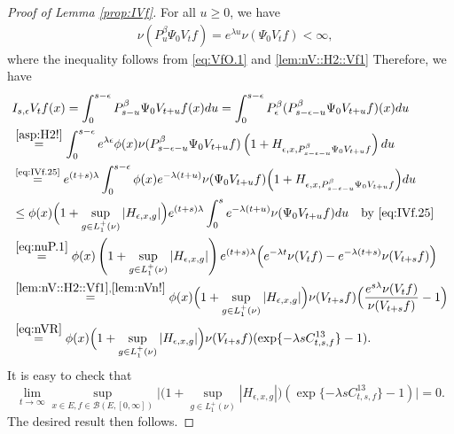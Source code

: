 \documentclass[12pt,a4paper]{amsart}
\numberwithin{equation}{section}
\theoremstyle{plain}
\theoremstyle{definition}
\theoremstyle{remark}
\begin{document}
\begin{proof}[Proof of Lemma \ref{prop:IVf}]
	For all $u\geq 0$, we have
\begin{align} \label{eq:IVf.25}
	&\nu(P_u^\beta \Psi_0 V_t f) = e^{\lambda u}\nu(\Psi_0 V_t f)<\infty,
\end{align}
where the inequality follows from \eqref{eq:VfO.1} and \eqref{lem:nV::H2::Vf1}
	Therefore, we have
\begin{align}
 	& I_{s,\epsilon} V_t f(x)
 	= \int_0^{s- \epsilon} P_{s-u}^\beta \Psi_0 V_{t+u} f (x) du
 	= \int_0^{s- \epsilon} P_\epsilon^\beta (P_{s - \epsilon - u}^\beta \Psi_0 V_{t+u} f )(x) du
 	\\&\overset{\eqref{asp:H2!}}
 	= \int_0^{s - \epsilon} e^{\lambda \epsilon} \phi(x) \nu(P_{s - \epsilon - u}^{\beta} \Psi_0 V_{t+u} f)  \left(1+H_{\epsilon ,x , P_{s - \epsilon - u}^{\beta} \Psi_0 V_{t+u} f}\right) du
	\\&\overset{\text{\eqref{eq:IVf.25}}}= e^{(t+s)\lambda} \int_0^{s - \epsilon} \phi(x) e^{-\lambda (t+u)}\nu(\Psi_0 V_{t+u} f)  \Big(1+H_{\epsilon ,x , P_{s - \epsilon - u}^{\beta} \Psi_0 V_{t+u} f}\Big) du
	\\&\leq \phi(x) \Big(1+\sup_{g\in L_1^+(\nu)}|H_{\epsilon ,x , g}|\Big) e^{(t+s)\lambda} \int_0^{s} e^{-\lambda (t+u)} \nu(\Psi_0 V_{t+u}f)du\quad
	\text{by \eqref{eq:IVf.25}}
 	\\&\overset{\eqref{eq:nuP.1}}= \phi(x) \left(1+\sup_{g\in L_1^+(\nu)}|H_{\epsilon ,x , g}|\right)  e^{(t+s)\lambda} \Big(e^{-\lambda t}\nu(V_tf)- e^{-\lambda(t+s)}\nu(V_{t+s}f)\Big)
 	\\&\overset{\eqref{lem:nV::H2::Vf1},\eqref{lem:nVn!}}= \phi(x) \Big(1+\sup_{g\in L_1^+(\nu)}|H_{\epsilon ,x , g}|\Big) \nu(V_{t+s}f) \Big( \frac{e^{s \lambda }\nu(V_tf)}{\nu(V_{t+s}f)} - 1\Big)
  \\&\overset{\eqref{eq:nVR}}= \phi(x) \Big(1+\sup_{g\in L_1^+(\nu)}|H_{\epsilon ,x , g}|\Big)
  \nu(V_{t+s}f) ( \exp\{- \lambda s C^{13}_{t,s,f}\} - 1).
\end{align}
	It is easy to check that
\begin{equation}
	\lim_{t\to \infty}\sup_{x\in E, f\in \mathcal B(E,[0,\infty])}
	\Big|\Big(1+\sup_{g\in L_1^+(\nu)}|H_{\epsilon ,x , g}|\Big)
	( \exp\{- \lambda s C^{13}_{t,s,f}\} - 1) \Big| = 0.
\end{equation}
	The desired result then follows.
\end{proof}
\end{document}
